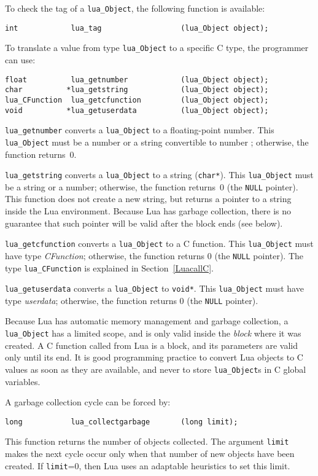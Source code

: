 To check the tag of a \verb|lua_Object|,
the following function is available:
\begin{verbatim}
int            lua_tag                  (lua_Object object);
\end{verbatim}

To translate a value from type \verb|lua_Object| to a specific C type,
the programmer can use:
\begin{verbatim}
float          lua_getnumber            (lua_Object object);
char          *lua_getstring            (lua_Object object);
lua_CFunction  lua_getcfunction         (lua_Object object);
void          *lua_getuserdata          (lua_Object object);
\end{verbatim}

\verb|lua_getnumber| converts a \verb|lua_Object| to a floating-point number.
This \verb|lua_Object| must be a number or a string convertible to number
; otherwise, the function returns~0.

\verb|lua_getstring| converts a \verb|lua_Object| to a string (\verb|char*|).
This \verb|lua_Object| must be a string or a number;
otherwise, the function returns~0 (the \verb|NULL| pointer).
This function does not create a new string,
but returns a pointer to a string inside the Lua environment.
Because Lua has garbage collection,
there is no guarantee that such pointer will be valid after the block ends
(see below).

\verb|lua_getcfunction| converts a \verb|lua_Object| to a C function.
This \verb|lua_Object| must have type \emph{CFunction};
otherwise, the function returns 0 (the \verb|NULL| pointer).
The type \verb|lua_CFunction| is explained in Section~\ref{LuacallC}.

\verb|lua_getuserdata| converts a \verb|lua_Object| to \verb|void*|.
This \verb|lua_Object| must have type \emph{userdata};
otherwise, the function returns 0 (the \verb|NULL| pointer).

Because Lua has automatic memory management and garbage collection,
a \verb|lua_Object| has a limited scope,
and is only valid inside the \emph{block} where it was created.
A C function called from Lua is a block,
and its parameters are valid only until its end.
It is good programming practice to convert Lua objects to C values
as soon as they are available,
and never to store \verb|lua_Object|s in C global variables.

A garbage collection cycle can be forced by:
\begin{verbatim}
long           lua_collectgarbage       (long limit);
\end{verbatim}
This function returns the number of objects collected.
The argument \verb|limit| makes the next cycle occur only
when that number of new objects have been created.
If \verb|limit|=0, then Lua uses an adaptable heuristics to set this limit.


